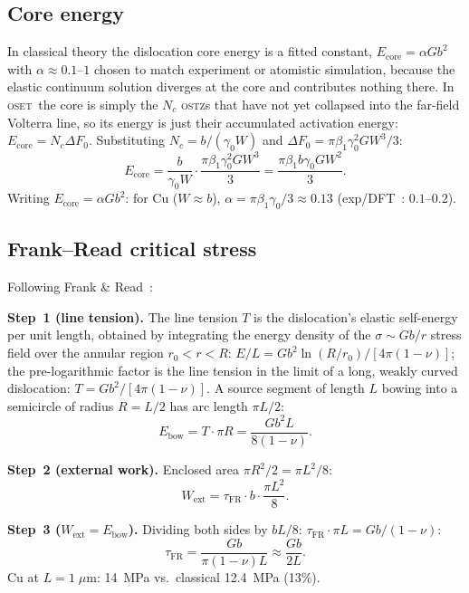 \documentclass[5p,sort&compress]{elsarticle}
\newcommand{\OSTZ}{\textsc{ostz}}
\newcommand{\OSET}{\textsc{oset}}
\newcommand{\dF}{\Delta F_0}
\newcommand{\gz}{\gamma_0}
\begin{document}
\subsection{Core energy}
\label{sec:coreE}

In classical theory the dislocation core energy is a fitted
constant, $E_\text{core}=\alpha Gb^2$ with $\alpha\approx0.1$--$1$
chosen to match experiment or atomistic simulation, because the
elastic continuum solution diverges at the core and contributes
nothing there. In \OSET\ the core is simply the $N_c$ \OSTZ s that
have not yet collapsed into the far-field Volterra line, so its
energy is just their accumulated activation energy:
$E_\text{core}=N_c\dF$. Substituting $N_c=b/(\gz W)$ and
$\dF=\pi\beta_1\gz^2GW^3/3$:
\begin{equation}
  \boxed{E_\text{core}=\frac{b}{\gz W}\cdot\frac{\pi\beta_1\gz^2GW^3}{3}
  =\frac{\pi\beta_1 b\gz GW^2}{3}.}
  \label{eq:coreE}
\end{equation}
Writing $E_\text{core}=\alpha Gb^2$: for Cu ($W\approx b$),
$\alpha=\pi\beta_1\gz/3\approx0.13$ (exp/DFT~\cite{woodward2002}: $0.1$--$0.2$).

\subsection{Frank--Read critical stress}
\label{sec:FR}

Following Frank \& Read~\cite{frank-read1950}:

\textbf{Step~1 (line tension).}
The line tension $T$ is the dislocation's elastic self-energy per
unit length, obtained by integrating the energy density of the
$\sigma\sim Gb/r$ stress field over the annular region
$r_0<r<R$: $E/L=Gb^2\ln(R/r_0)/[4\pi(1-\nu)]$; the pre-logarithmic
factor is the line tension in the limit of a long, weakly curved
dislocation:
$T=Gb^2/[4\pi(1-\nu)]$. A source segment of length $L$ bowing into
a semicircle of radius $R=L/2$ has arc
length $\pi L/2$:
\begin{equation}
  E_\text{bow}=T\cdot\pi R=\frac{Gb^2L}{8(1-\nu)}.
  \label{eq:Ebow}
\end{equation}

\textbf{Step~2 (external work).}
Enclosed area $\pi R^2/2=\pi L^2/8$:
\begin{equation}
  W_\text{ext}=\tau_\text{FR}\cdot b\cdot\frac{\pi L^2}{8}.
  \label{eq:Wext}
\end{equation}

\textbf{Step~3 ($W_\text{ext}=E_\text{bow}$).}
Dividing both sides by $bL/8$:
$\tau_\text{FR}\cdot\pi L=Gb/(1-\nu)$:
\begin{equation}
  \boxed{\tau_\text{FR}=\frac{Gb}{\pi(1-\nu)L}\approx\frac{Gb}{2L}.}
  \label{eq:FR}
\end{equation}
Cu at $L=1\;\mu$m: 14~MPa vs.\ classical 12.4~MPa (13\%).
\end{document}
